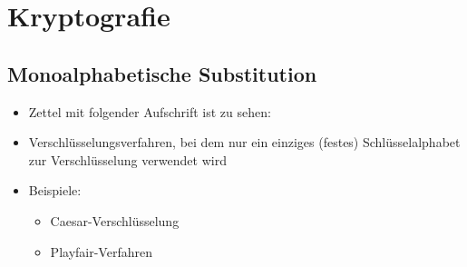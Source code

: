 \section{Kryptografie}

\subsection{Monoalphabetische Substitution}

\begin{frame}
\begin{itemize}
	\item Zettel mit folgender Aufschrift ist zu sehen:
\end{itemize}
\begin{figure}[ht]
	\centering
\end{figure}
\end{frame}

\begin{frame}
\begin{itemize}
	\item Verschlüsselungsverfahren, bei dem nur ein einziges (festes) Schlüsselalphabet zur Verschlüsselung verwendet wird
	\item Beispiele:
	\begin{itemize}
		\item Caesar-Verschlüsselung
		\item Playfair-Verfahren
	\end{itemize}
\end{itemize}
\end{frame}

